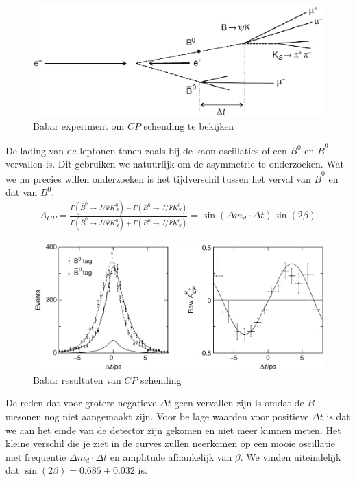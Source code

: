 \documentclass[../main.tex]{subfiles}
\begin{document}
\begin{figure}[h]
    \centering
    \includegraphics[width=0.6\linewidth]{cp_violation/babar.png}
    \caption{Babar experiment om $CP$ schending te bekijken}%
    \label{fig:cp_violation/babar}
\end{figure}

De lading van de leptonen tonen zoals bij de kaon oscillaties of een $B^0$ en $\bar{B}^0$ vervallen is. Dit gebruiken we natuurlijk om de asymmetrie te onderzoeken. Wat we nu precies willen onderzoeken is het tijdverschil tussen het verval van $\bar{B}^0$ en dat van $B^0$.
\begin{equation}
    \begin{aligned}
        \label{eq:cp_asymmetrie}
        A_{C P}=\frac{\Gamma\left(\bar{B}^{0} \rightarrow J / \Psi K_{S}^{0}\right)-\Gamma\left(B^{0} \rightarrow J / \Psi K_{S}^{0}\right)}{\Gamma\left(\bar{B}^{0} \rightarrow J / \Psi K_{S}^{0}\right)+\Gamma\left(B^{0} \rightarrow J / \Psi K_{S}^{0}\right)}=\sin \left(\Delta m_{d} \cdot \Delta t\right) \sin (2 \beta)
    \end{aligned}
\end{equation}

\begin{figure}[h]
    \centering
    \includegraphics[width=0.6\linewidth]{cp_violation/babar_results.png}
    \caption{Babar resultaten van $CP$ schending}%
    \label{fig:cp_violation/babar_results}
\end{figure}

De reden dat voor grotere negatieve $\Delta t$ geen vervallen zijn is omdat de $B$ mesonen nog niet aangemaakt zijn. Voor be lage waarden voor positieve $\Delta t$ is dat we aan het einde van de detector zijn gekomen en niet meer kunnen meten. Het kleine verschil die je ziet in de curves zullen neerkomen op een mooie oscillatie met frequentie $\Delta m_d \cdot \Delta t$ en amplitude afhankelijk van $\beta$. We vinden uiteindelijk dat $\sin (2 \beta)=0.685 \pm 0.032$ is.
\end{document}
